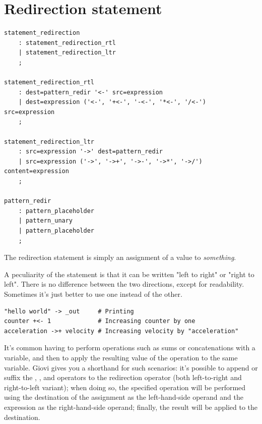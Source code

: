 
\section{Redirection statement}

\begin{verbatim}
statement_redirection
	: statement_redirection_rtl
	| statement_redirection_ltr
	;

statement_redirection_rtl
	: dest=pattern_redir '<-' src=expression
	| dest=expression ('<-', '+<-', '-<-', '*<-', '/<-') src=expression
	;

statement_redirection_ltr
	: src=expression '->' dest=pattern_redir
	| src=expression ('->', '->+', '->-', '->*', '->/') content=expression
	;

pattern_redir
	: pattern_placeholder
	| pattern_unary
	| pattern_placeholder
	;
\end{verbatim}

The redirection statement is simply an assignment of a value to
\textit{something}.

A peculiarity of the statement is that it can be written "left to right" or
"right to left". There is no difference between the two directions, except for
readability. Sometimes it's just better to use one instead of the other.


\begin{verbatim}
"hello world" -> _out     # Printing
counter +<- 1             # Increasing counter by one
acceleration ->+ velocity # Increasing velocity by "acceleration"
\end{verbatim}

It's common having to perform operations such as sums or concatenations with a
variable, and then to apply the resulting value of the operation to the same
variable. Giovi gives you a shorthand for such scenarios: it's possible to
append or suffix the \code{+}, \code{-}, \code{*} and \code{/} operators to the
redirection operator (both left-to-right and right-to-left variant); when doing
so, the specified operation will be performed using the destination of the
assignment as the left-hand-side operand and the expression as the
right-hand-side operand; finally, the result will be applied to the
destination.

